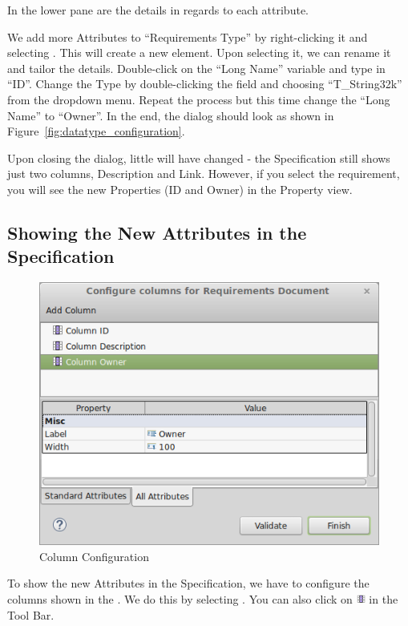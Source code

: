 In the lower pane are the details in regards to each attribute.

We add more Attributes to ``Requirements Type'' by right-clicking it and selecting .  This will create a new element.  Upon selecting it, we can rename it and tailor the details.  Double-click on the ``Long Name'' variable and type in ``ID''.  Change the Type by double-clicking the field and choosing ``T\_String32k'' from the dropdown menu.  Repeat the process but this time change the ``Long Name'' to ``Owner''.  In the end, the dialog should look as shown in Figure~\ref{fig:datatype_configuration}.

Upon closing the dialog, little will have changed - the Specification still shows just two columns, Description and Link.  However, if you select the requirement, you will see the new Properties (ID and Owner) in the Property view.

\subsection{Showing the New Attributes in the Specification}

\begin{figure}
\centering      
\includegraphics[width=0.8\linewidth]{../rmf-images/columnconfig.png}      
\caption{Column Configuration}
\label{fig:column_configuration}
\end{figure}

To show the new Attributes in the Specification, we have to configure the columns shown in the .  We do this by selecting .  You can also click on \includegraphics[height=0.8em]{../rmf-images/icons/full/obj16/Column.png} in the Tool Bar.

